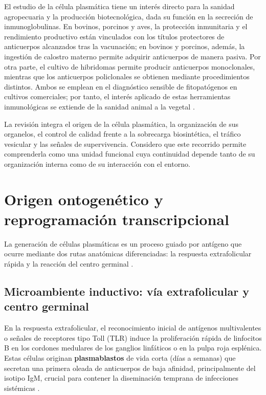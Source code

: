 El estudio de la célula plasmática tiene un interés directo para la sanidad agropecuaria y la producción biotecnológica, dada su función en la secreción de inmunoglobulinas. En bovinos, porcinos y aves, la protección inmunitaria y el rendimiento productivo están vinculados con los títulos protectores de anticuerpos alcanzados tras la vacunación; en bovinos y porcinos, además, la ingestión de calostro materno permite adquirir anticuerpos de manera pasiva. Por otra parte, el cultivo de hibridomas permite producir anticuerpos monoclonales, mientras que los anticuerpos policlonales se obtienen mediante procedimientos distintos. Ambos se emplean en el diagnóstico sensible de fitopatógenos en cultivos comerciales; por tanto, el interés aplicado de estas herramientas inmunológicas se extiende de la sanidad animal a la vegetal \parencite{tellier2019plasma}.



La revisión integra el origen de la célula plasmática, la organización de sus organelos, el control de calidad frente a la sobrecarga biosintética, el tráfico vesicular y las señales de supervivencia. Considero que este recorrido permite comprenderla como una unidad funcional cuya continuidad depende tanto de su organización interna como de su interacción con el entorno.


\section{Origen ontogenético y reprogramación transcripcional}

La generación de células plasmáticas es un proceso guiado por antígeno que ocurre mediante dos rutas anatómicas diferenciadas: la respuesta extrafolicular rápida y la reacción del centro germinal \parencite{nutt2015generation}.

\subsection{Microambiente inductivo: vía extrafolicular y centro germinal}
En la respuesta extrafolicular, el reconocimiento inicial de antígenos multivalentes o señales de receptores tipo Toll (TLR) induce la proliferación rápida de linfocitos B en los cordones medulares de los ganglios linfáticos o en la pulpa roja esplénica. Estas células originan \textbf{plasmablastos} de vida corta (días a semanas) que secretan una primera oleada de anticuerpos de baja afinidad, principalmente del isotipo IgM, crucial para contener la diseminación temprana de infecciones sistémicas \parencite{abbas2022cellular}.



